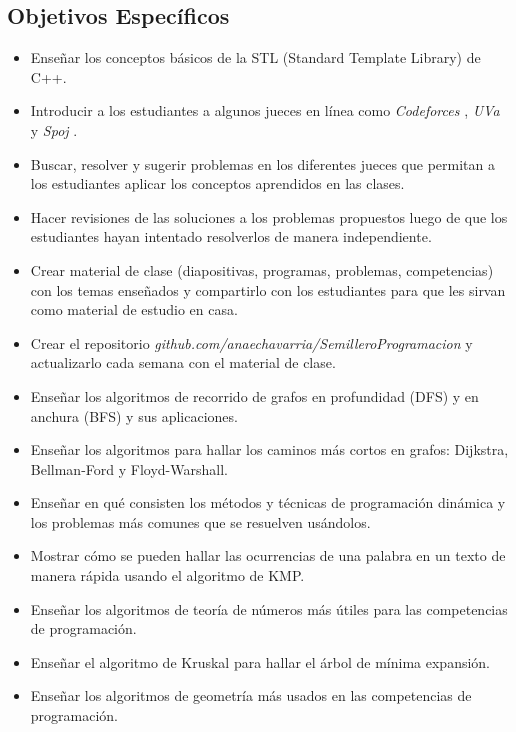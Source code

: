 \documentclass[11pt, oneside]{article}
\theoremstyle{definition}
\theoremstyle{remark}
\begin{document}
\subsection{Objetivos Específicos}
\begin{itemize}
	\item{Enseñar los conceptos básicos de la STL (Standard Template Library) de C++.}
	\item{Introducir a los estudiantes a algunos jueces en línea como \emph{Codeforces} \cite{Codeforces}, \emph{UVa} \cite{UVa} y \emph{Spoj} \cite{Spoj}.}
	\item{Buscar, resolver y sugerir problemas en los diferentes jueces que permitan a los estudiantes aplicar los conceptos aprendidos en las clases.}
	\item{Hacer revisiones de las soluciones a los problemas propuestos luego de que los estudiantes hayan intentado resolverlos de manera independiente.}
	\item{Crear material de clase (diapositivas, programas, problemas, competencias) con los temas enseñados y compartirlo con los estudiantes para que les sirvan como material de estudio en casa.}
	\item{Crear el repositorio \emph{github.com/anaechavarria/SemilleroProgramacion} y actualizarlo cada semana con el material de clase.}
	\item{Enseñar los algoritmos de recorrido de grafos en profundidad (DFS) y en anchura (BFS) y sus aplicaciones.}
	\item{Enseñar los algoritmos para hallar los caminos más cortos en grafos: Dijkstra, Bellman-Ford y Floyd-Warshall.}
	\item{Enseñar en qué consisten los métodos y técnicas de programación dinámica y los problemas más comunes que se resuelven usándolos.}
	\item{Mostrar cómo se pueden hallar las ocurrencias de una palabra en un texto de manera rápida usando el algoritmo de KMP.}
	\item{Enseñar los algoritmos de teoría de números más útiles \cite{ProgrammingChallenges, Halim, Halim2, Brasil} para las competencias de programación.}
	\item{Enseñar el algoritmo de Kruskal para hallar el árbol de mínima expansión.}
	\item{Enseñar los algoritmos de geometría más usados \cite{ProgrammingChallenges, Halim, Halim2, Brasil} en las competencias de programación.}
\end{itemize}
\end{document}
